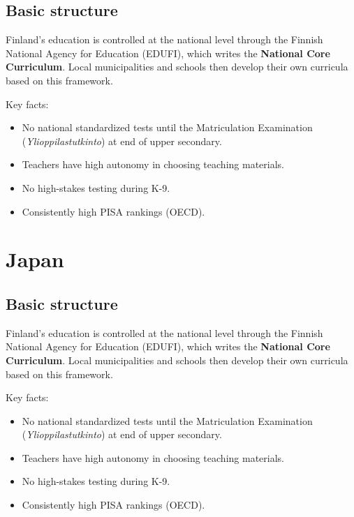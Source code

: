 \section{Basic structure}

Finland's education is controlled at the national level through the Finnish National Agency for Education (EDUFI), which writes the \textbf{National Core Curriculum}. Local municipalities and schools then develop their own curricula based on this framework.

Key facts:
\begin{itemize}
	\item No national standardized tests until the Matriculation Examination (\textit{Ylioppilastutkinto}) at end of upper secondary.
	\item Teachers have high autonomy in choosing teaching materials.
	\item No high-stakes testing during K-9.
	\item Consistently high PISA rankings (OECD).
\end{itemize}






\chapter{Japan}


\section{Basic structure}

Finland's education is controlled at the national level through the Finnish National Agency for Education (EDUFI), which writes the \textbf{National Core Curriculum}. Local municipalities and schools then develop their own curricula based on this framework.

Key facts:
\begin{itemize}
	\item No national standardized tests until the Matriculation Examination (\textit{Ylioppilastutkinto}) at end of upper secondary.
	\item Teachers have high autonomy in choosing teaching materials.
	\item No high-stakes testing during K-9.
	\item Consistently high PISA rankings (OECD).
\end{itemize}



